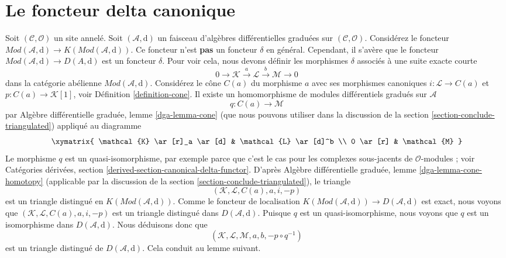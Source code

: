 \section{Le foncteur delta canonique}
\label{section-canonical-delta-functor}

\noindent
Soit $(\mathcal{C}, \mathcal{O})$ un site annelé.
Soit $(\mathcal{A}, \text{d})$ un faisceau d'algèbres différentielles graduées sur $(\mathcal{C}, \mathcal{O})$.
Considérez le foncteur $\textit{Mod}(\mathcal{A}, \text{d}) \to K(\textit{Mod}(\mathcal{A}, \text{d}))$.
Ce foncteur n'est {\bf pas} un foncteur $\delta$ en général.
Cependant, il s'avère que le foncteur $\textit{Mod}(\mathcal{A}, \text{d}) \to D(A, \text{d})$ est un foncteur $\delta$.
Pour voir cela, nous devons définir les morphismes $\delta$ associés à une suite exacte courte
$$
0 \to \mathcal{K} \xrightarrow{a} \mathcal{L} \xrightarrow{b} \mathcal{M} \to 0
$$
dans la catégorie abélienne $\textit{Mod}(\mathcal{A}, \text{d})$.
Considérez le cône $C(a)$ du morphisme $a$ avec ses morphismes canoniques $i : \mathcal{L} \to C(a)$ et $p : C(a) \to \mathcal{K}[1]$, voir Définition \ref{definition-cone}.
Il existe un homomorphisme de modules différentiels gradués sur $\mathcal{A}$
$$
q : C(a) \longrightarrow \mathcal{M}
$$
par Algèbre différentielle graduée, lemme \ref{dga-lemma-cone} (que nous pouvons utiliser dans la discussion de la section \ref{section-conclude-triangulated}) appliqué au diagramme
$$
\xymatrix{
\mathcal{K} \ar[r]_a \ar[d] &
\mathcal{L} \ar[d]^b \\
0 \ar[r] &
\mathcal{M}
}
$$
Le morphisme $q$ est un quasi-isomorphisme, par exemple parce que c'est le cas pour les complexes sous-jacents de $\mathcal{O}$-modules ; voir Catégories dérivées, section \ref{derived-section-canonical-delta-functor}.
D'après Algèbre différentielle graduée, lemme \ref{dga-lemma-cone-homotopy} (applicable par la discussion de la section \ref{section-conclude-triangulated}), le triangle
$$
(\mathcal{K}, \mathcal{L}, C(a), a, i, -p)
$$
est un triangle distingué en $K(\textit{Mod}(\mathcal{A}, \text{d}))$.
Comme le foncteur de localisation $K(\textit{Mod}(\mathcal{A}, \text{d})) \to D(\mathcal{A}, \text{d})$ est exact, nous voyons que $(\mathcal{K}, \mathcal{L}, C(a), a, i, -p)$ est un triangle distingué dans $D(\mathcal{A}, \text{d})$.
Puisque $q$ est un quasi-isomorphisme, nous voyons que $q$ est un isomorphisme dans $D(\mathcal{A}, \text{d})$.
Nous déduisons donc que
$$
(\mathcal{K}, \mathcal{L}, \mathcal{M}, a, b, -p \circ q^{-1})
$$
est un triangle distingué de $D(\mathcal{A}, \text{d})$.
Cela conduit au lemme suivant.

